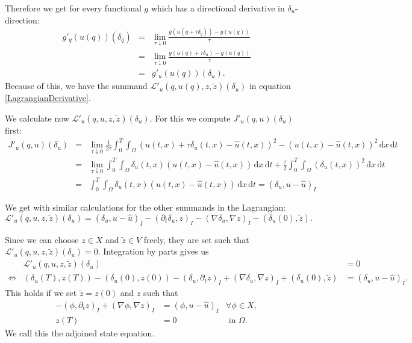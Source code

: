 Therefore we get for every functional $g$ which has a directional derivative in $\delta_u$-direction:
\begin{eqnarray*}
g'_q(u(q))(\delta_q)&=&\lim_{\tau\downarrow0}\frac{g(u(q+\tau\delta_q))-g(u(q))}{\tau}\\
&=&\lim_{\tau\downarrow0}\frac{g(u(q)+\tau\delta_u)-g(u(q))}{\tau}\\
&=&g'_u(u(q))(\delta_u).
\end{eqnarray*}
Because of this, we have the summand $\mathcal{L}'_u(q,u(q),z,\tilde{z})(\delta_u)$ in equation \eqref{LagrangianDerivative}.

We calculate now $\mathcal{L}'_u(q,u,z,\tilde{z})(\delta_u)$. For this we compute $J'_u(q, u)(\delta_u)$ first:
\begin{eqnarray*}
J'_u(q, u)(\delta_u)&=&\lim_{\tau\downarrow0}\frac{1}{2\tau}\int_0^T\int_\Omega(u(t,x)+\tau\delta_u(t, x)-\hat{u}(t,x))^2-(u(t,x)-\hat{u}(t,x))^2\,\mathrm{d}x\,\mathrm{d}t\\
&=&\lim_{\tau\downarrow0}\int_0^T\int_\Omega\delta_u(t, x)(u(t,x)-\hat{u}(t,x))\,\mathrm{d}x\,\mathrm{d}t+\frac{\tau}{2}\int_0^T\int_\Omega(\delta_u(t, x))^2\,\mathrm{d}x\,\mathrm{d}t\\
&=&\int_0^T\int_\Omega\delta_u(t, x)(u(t,x)-\hat{u}(t,x))\,\mathrm{d}x\,\mathrm{d}t=(\delta_u,u-\hat{u})_I
\end{eqnarray*}

We get with similar calculations for the other summands in the Lagrangian:
\begin{equation*}
\mathcal{L}'_u(q,u,z,\tilde{z})(\delta_u)=(\delta_u,u-\hat{u})_I-(\partial_t\delta_u,z)_I-(\nabla\delta_u,\nabla z)_I-(\delta_u(0),\tilde{z}).
\end{equation*}

Since we can choose $z\in X$ and $\tilde{z}\in V$ freely, they are set such that $\mathcal{L}'_u(q,u,z,\tilde{z})(\delta_u)=0$. Integration by parts gives us
\begin{eqnarray*}
&\mathcal{L}'_u(q,u,z,\tilde{z})(\delta_u)&=0\\
\iff&(\delta_u(T),z(T))-(\delta_u(0),z(0))-(\delta_u,\partial_tz)_I+(\nabla\delta_u,\nabla z)_I+(\delta_u(0),\tilde{z})&=(\delta_u,u-\hat{u})_I.
\end{eqnarray*}
This holds if we set $\tilde{z}=z(0)$ and $z$ such that
\begin{equation}
\label{adjoinedStateEquation}
\begin{aligned}
	-(\phi,\partial_tz)_I+(\nabla \phi,\nabla z)_I&=(\phi, u-\hat{u})_I&\forall\phi\in X,\\
	z(T)&=0&\text{ in }\Omega.
\end{aligned}
\end{equation}
We call this the adjoined state equation.

